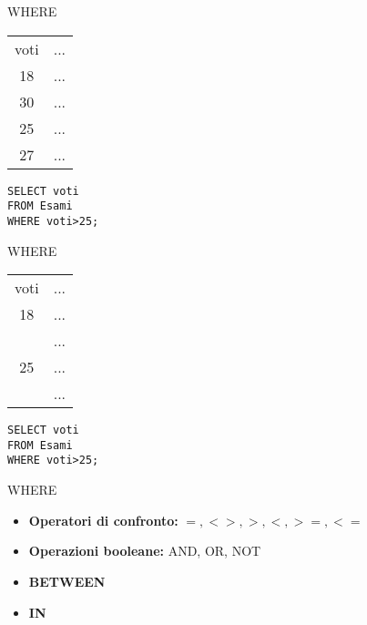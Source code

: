     \begin{frame}{WHERE}
    \begin{table}[h]
    \centering
    \begin{tabular}{|c|c|}
    \hline
    \rowcolor{cyan!30}\multicolumn{2}{|c|}{Esami} \\
    \hline
    \rowcolor{cyan!30}voti &  ...  \\
    \hline
    18 &  ... \\
    30 &  ...  \\
    25 &  ...  \\
    27 &  ...  \\
    \hline
    \end{tabular}
    \end{table}
    \texttt{SELECT voti \\FROM Esami\\ WHERE voti>25;}
    \end{frame}
    \begin{frame}{WHERE}
    \begin{table}[h]
    \centering
    \begin{tabular}{|c|c|}
    \hline
    \rowcolor{cyan!30}\multicolumn{2}{|c|}{Esami} \\
    \hline
    \rowcolor{cyan!30}voti &  ...  \\
    \hline
    18 &  ... \\
    \cellcolor{red!20}{30} &  ...  \\
    25 &  ...  \\
    \cellcolor{red!20}{27} &  ...  \\
    \hline
    \end{tabular}
    \end{table}
    \texttt{SELECT voti \\FROM Esami\\ WHERE voti>25;}
    \end{frame}
    \begin{frame}{WHERE}
    \begin{itemize}
        \item \textbf{Operatori di confronto:} $=, <>, >, <, >=, <=$
        \item \textbf{Operazioni booleane:} AND, OR, NOT
        \item \textbf{BETWEEN}
        \item \textbf{IN}
    \end{itemize}
    \end{frame}
